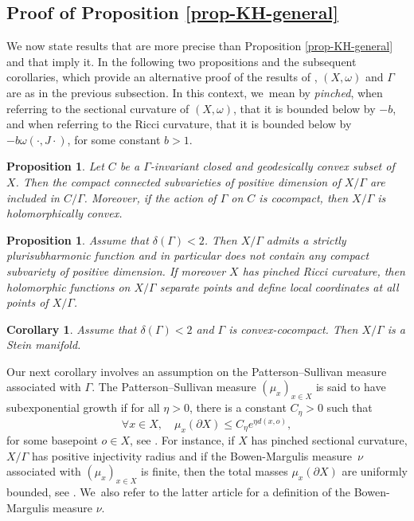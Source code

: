 \documentclass[11pt]{article}
\newtheorem{corollary}[theorem]{Corollary}
\newtheorem{proposition}[theorem]{Proposition}
\theoremstyle{definition}
\begin{document}
\subsection{Proof of Proposition \ref{prop-KH-general}}\label{ss-section-preuve-prop5}

We now state results that are more precise than Proposition \ref{prop-KH-general} and that imply it. In the following two propositions and the subsequent corollaries, which provide an alternative proof of the results of \cite{deyNoteComplexhyperbolicKleinian2020}, $(X,\omega)$ and $\Gamma$ are as in the previous subsection. In this context, we~mean by \textit{pinched}, when referring to the sectional curvature of $(X,\omega)$, that it is bounded below by $-b$, and when referring to the Ricci curvature, that it is bounded below by $-b\omega(\cdot,J\cdot)$, for some constant $b>1$.

\begin{proposition}\label{prop-KH-hol-cvx}
Let $C$ be a $\Gamma$\nobreakdash-invariant closed and geodesically convex subset of~$X$. Then the compact connected subvarieties of positive dimension of $X/\Gamma$ are included in $C/\Gamma$. Moreover, if the action of $\Gamma$ on $C$ is cocompact, then $X/\Gamma$ is holomorphically convex.
\end{proposition}

\begin{proposition}\label{prop-KH-ss-ens}
Assume that $\delta(\Gamma)<2$. Then $X/\Gamma$ admits a strictly plurisubharmonic function and in particular does not contain any compact subvariety of positive dimension. If moreover $X$ has pinched Ricci curvature, then holomorphic functions on $X/\Gamma$ separate points and define local coordinates at all points of $X/\Gamma$.
\end{proposition}

\begin{corollary}\label{cor-cvx+delta:stein}
Assume that $\delta(\Gamma)<2$ and $\Gamma$ is convex-cocompact. Then $X/\Gamma$ is a Stein manifold.
\end{corollary}

Our next corollary involves an assumption on the Patterson--Sullivan measure associated with $\Gamma$. The Patterson--Sullivan measure $(\mu_x)_{x\in X}$ is said to have subexponential growth if for all $\eta>0$, there is a constant $C_{\eta}>0$ such that
\begin{equation*}
\forall x\in X,\quad \mu_x(\partial X) \le C_{\eta}e^{\eta d(x,o)},
\end{equation*}
for some basepoint $o\in X$, see \cite[\S1.4]{connellNaturalFlowCritical2023}. For instance, if $X$ has pinched sectional curvature, $X/\Gamma$ has positive injectivity radius and if the Bowen-Margulis measure~$\nu$ associated with $(\mu_x)_{x\in X}$ is finite, then the total masses $\mu_x(\partial X)$ are uniformly bounded, see \cite[Th.\,1.15]{connellNaturalFlowCritical2023}. We~also refer to the latter article for a definition of the Bowen-Margulis measure $\nu$.
\end{document}
